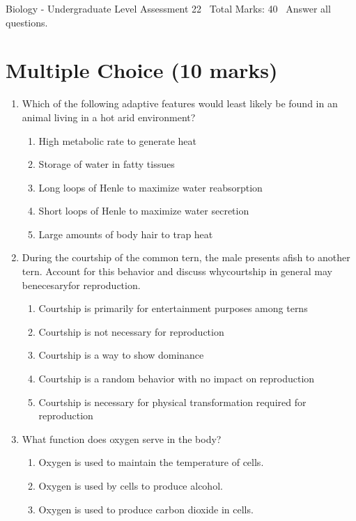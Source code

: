 \documentclass[12pt]{article}
\begin{document}
\begin{center}
Biology - Undergraduate Level Assessment 22 \
Total Marks: 40 \
Answer all questions.
\end{center}

\section*{Multiple Choice (10 marks)}
\begin{enumerate}[label=\arabic*.]
\item Which of the following adaptive features would least likely be found in an animal living in a hot arid environment?
\begin{enumerate}[label=(\alph*)]
    \item High metabolic rate to generate heat
    \item Storage of water in fatty tissues
    \item Long loops of Henle to maximize water reabsorption
    \item Short loops of Henle to maximize water secretion
    \item Large amounts of body hair to trap heat
\end{enumerate}
\item During the courtship of the common tern, the male presents afish to another tern. Account for this behavior and discuss whycourtship in general may benecesaryfor reproduction.
\begin{enumerate}[label=(\alph*)]
    \item Courtship is primarily for entertainment purposes among terns
    \item Courtship is not necessary for reproduction
    \item Courtship is a way to show dominance
    \item Courtship is a random behavior with no impact on reproduction
    \item Courtship is necessary for physical transformation required for reproduction
\end{enumerate}
\item What function does oxygen serve in the body?
\begin{enumerate}[label=(\alph*)]
    \item Oxygen is used to maintain the temperature of cells.
    \item Oxygen is used by cells to produce alcohol.
    \item Oxygen is used to produce carbon dioxide in cells.

\end{enumerate}
\end{enumerate}
\end{document}
